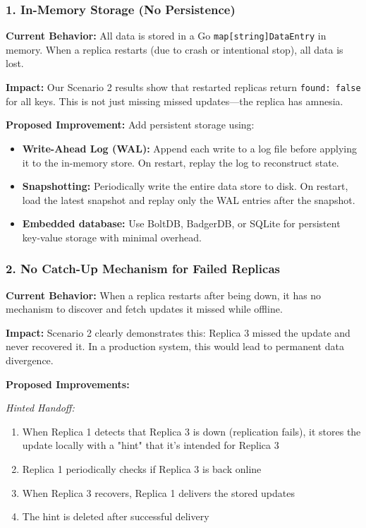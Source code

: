 \documentclass[10pt,a4paper]{article}
\begin{document}
\subsubsection{1. In-Memory Storage (No Persistence)}

\textbf{Current Behavior:} All data is stored in a Go \texttt{map[string]DataEntry} in memory. When a replica restarts (due to crash or intentional stop), all data is lost.

\textbf{Impact:} Our Scenario 2 results show that restarted replicas return \texttt{found: false} for all keys. This is not just missing missed updates---the replica has amnesia.

\textbf{Proposed Improvement:} Add persistent storage using:
\begin{itemize}
    \item \textbf{Write-Ahead Log (WAL):} Append each write to a log file before applying it to the in-memory store. On restart, replay the log to reconstruct state.
    \item \textbf{Snapshotting:} Periodically write the entire data store to disk. On restart, load the latest snapshot and replay only the WAL entries after the snapshot.
    \item \textbf{Embedded database:} Use BoltDB, BadgerDB, or SQLite for persistent key-value storage with minimal overhead.
\end{itemize}

\subsubsection{2. No Catch-Up Mechanism for Failed Replicas}

\textbf{Current Behavior:} When a replica restarts after being down, it has no mechanism to discover and fetch updates it missed while offline.

\textbf{Impact:} Scenario 2 clearly demonstrates this: Replica 3 missed the update and never recovered it. In a production system, this would lead to permanent data divergence.

\textbf{Proposed Improvements:}

\textit{Hinted Handoff:}
\begin{enumerate}
    \item When Replica 1 detects that Replica 3 is down (replication fails), it stores the update locally with a "hint" that it's intended for Replica 3
    \item Replica 1 periodically checks if Replica 3 is back online
    \item When Replica 3 recovers, Replica 1 delivers the stored updates
    \item The hint is deleted after successful delivery
\end{enumerate}
\end{document}
